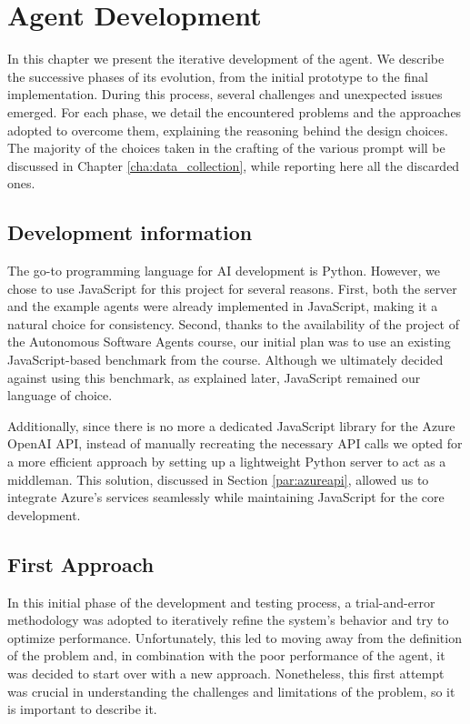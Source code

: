 \chapter{Agent Development}
\label{cha:agent_development}

In this chapter we present the iterative development of the agent. We describe the
successive phases of its evolution, from the initial prototype to the final
implementation. During this process, several challenges and unexpected issues
emerged. For each phase, we detail the encountered problems and the approaches
adopted to overcome them, explaining the reasoning behind the design choices.
The majority of the choices taken in the crafting of the various prompt will be
discussed in Chapter \ref{cha:data_collection}, while reporting here all the discarded
ones.

\section{Development information}
\label{sec:development_information}

The go-to programming language for AI development is Python. However, we chose
to use JavaScript for this project for several reasons. First, both the server
and the example agents were already implemented in JavaScript, making it a natural
choice for consistency. Second, thanks to the availability of the project of the
Autonomous Software Agents course, our initial plan was to use an existing
JavaScript-based benchmark from the course. Although we ultimately decided against
using this benchmark, as explained later, JavaScript remained our language of choice.

Additionally, since there is no more a dedicated JavaScript library for the
Azure OpenAI API, instead of manually recreating the necessary API calls we opted
for a more efficient approach by setting up a lightweight Python server to act as
a middleman. This solution, discussed in Section \ref{par:azureapi}, allowed us
to integrate Azure's services seamlessly while maintaining JavaScript for the
core development.

\section{First Approach}
\label{sec:first_approach}

In this initial phase of the development and testing process, a trial-and-error
methodology was adopted to iteratively refine the system's behavior and try to
optimize performance. Unfortunately, this led to moving away from the definition
of the problem and, in combination with the poor performance of the agent, it
was decided to start over with a new approach. Nonetheless, this first attempt
was crucial in understanding the challenges and limitations of the problem, so it
is important to describe it.

